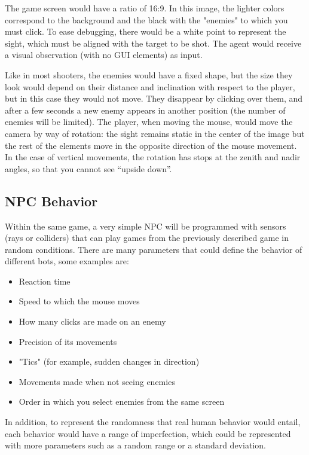 The game screen would have a ratio of 16:9. In this image, the lighter colors correspond to the background and the black with the "enemies" to which you must click. To ease debugging, there would be a white point to represent the sight, which must be aligned with the target to be shot. The agent would receive a visual observation (with no GUI elements) as input.

Like in most shooters, the enemies would have a fixed shape, but the size they look would depend on their distance and inclination with respect to the player, but in this case they would not move. They disappear by clicking over them, and after a few seconds a new enemy appears in another position (the number of enemies will be limited).
The player, when moving the mouse, would move the camera by way of rotation: the sight remains static in the center of the image but the rest of the elements move in the opposite direction of the mouse movement. In the case of vertical movements, the rotation has stops at the zenith and nadir angles, so that you cannot see “upside down”.

\subsection{NPC Behavior}
\label{sec:npcbehavior}

Within the same game, a very simple NPC will be programmed with sensors (rays or colliders) that can play games from the previously described game in random conditions. There are many parameters that could define the behavior of different bots, some examples are:
\begin{itemize}
 \item Reaction time
 \item Speed to which the mouse moves
 \item How many clicks are made on an enemy
 \item Precision of its movements
 \item "Tics" (for example, sudden changes in direction)
 \item Movements made when not seeing enemies
 \item Order in which you select enemies from the same screen
\end{itemize}

In addition, to represent the randomness that real human behavior would entail, each behavior would have a range of imperfection, which could be represented with more parameters such as a random range or a standard deviation.

